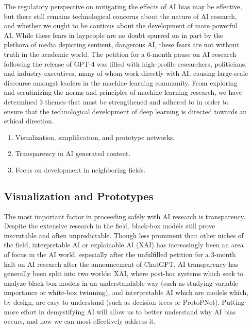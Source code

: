 \documentclass[10pt]{article}
\begin{document}
  The regulatory perspective on mitigating the effects of AI bias may be effective, but there still remains technological concerns about the nature of AI research, and whether we ought to be cautious about the development of more powerful AI. While these fears in laypeople are no doubt spurred on in part by the plethora of media depicting sentient, dangerous AI, these fears are not without truth in the academic world. The petition for a 6-month pause on AI research following the release of GPT-4 was filled with high-profile researchers, politicians, and industry executives, many of whom work directly with AI, causing large-scale discourse amongst leaders in the machine learning community. From exploring and scrutinizing the norms and principles of machine learning research, we have determined 3 themes that must be strengthened and adhered to in order to ensure that the technological development of deep learning is directed towards an ethical direction. 

  \begin{enumerate}
    \item Visualization, simplification, and prototype networks. 
    \item Transparency in AI generated content.  
    \item Focus on development in neighboring fields. 
  \end{enumerate}

  \subsection{Visualization and Prototypes} 

    The most important factor in proceeding safely with AI research is transparency. Despite the extensive research in the field, black-box models still prove inscrutable and often unpredictable. Though less prominent than other niches of the field, interpretable AI or explainable AI (XAI) has increasingly been an area of focus in the AI world, especially after the unfulfilled petition for a 3-month halt on AI research after the announcement of ChatGPT. AI transparency has generally been split into two worlds: XAI, where post-hoc systems which seek to analyze black-box models in an understandable way (such as studying variable importance or white-box twinning), and interpretable AI which are models which, by design, are easy to understand (such as decision trees or ProtoPNet). Putting more effort in demystifying AI will allow us to better understand why AI bias occurs, and how we can most effectively address it.
\end{document}

